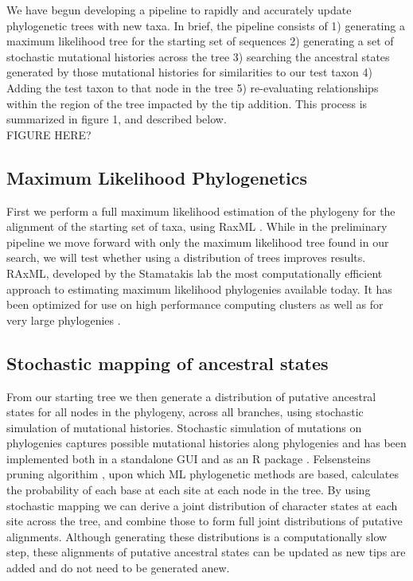\documentclass[10pt]{article}
\begin{document}
We have begun developing a pipeline to rapidly and accurately update phylogenetic trees with new taxa. 
In brief, the pipeline consists of 1) generating a maximum likelihood tree for the starting set of sequences 2) generating a set of stochastic mutational histories across the tree 3) searching the ancestral states generated by those mutational histories for similarities to our test taxon 4) Adding the test taxon to that node in the tree 5) re-evaluating relationships within the region of the tree impacted by the tip addition. 
This process is summarized in figure 1, and described below.
\\     FIGURE HERE?

\subsection*{Maximum Likelihood Phylogenetics}
First we perform a full maximum likelihood estimation of the phylogeny for the alignment of the starting set of taxa, using RaxML \cite{stamatakis_RAxML-VI-HPC:_2006}. 
While in the preliminary pipeline we move forward with only the maximum likelihood tree found in our search, we will test whether using a distribution of trees improves results. 
RAxML, developed by the Stamatakis lab the most computationally efficient approach to estimating maximum likelihood phylogenies available today. 
It has been optimized for use on high performance computing clusters \cite{stamatakis_RAxML-VI-HPC:_2006} as well as for very large phylogenies \cite{stamatakis_RAxML-Light:_2012}.

\subsection*{Stochastic mapping of ancestral states}
From our starting tree we then generate a distribution of putative ancestral states for all nodes in the phylogeny, across all branches, using stochastic simulation of mutational histories. 
Stochastic simulation of mutations on phylogenies captures possible mutational histories along phylogenies \cite{nielsen_mapping_2002}\cite{huelsenbeck_stochastic_2003} and has been implemented both in a standalone GUI \cite{bollback_simmap:_2006} and as an R package \cite{revell_phytools:_2012}. 
Felsensteins pruning algorithim \cite{felsenstein_evolutionary_1981}, upon which ML phylogenetic methods are based, calculates the probability of each base at each site at each node in the tree. 
By using stochastic mapping we can derive a joint distribution of character states at each site across the tree, and combine those to form full joint distributions of putative alignments. 
Although generating these distributions is a computationally slow step, these alignments of putative ancestral states can be updated as new tips are added and do not need to be generated anew. 
\end{document}
